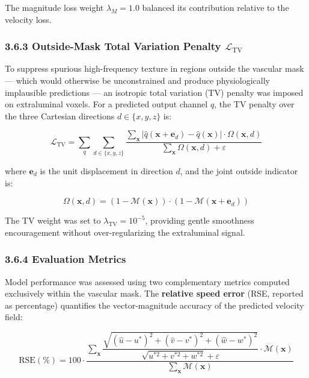 \documentclass[11pt]{article}
\begin{document}
The magnitude loss weight $\lambda_M = 1.0$ balanced its contribution relative to the velocity loss.

\subsubsection*{3.6.3 Outside-Mask Total Variation Penalty $\mathcal{L}_{\text{TV}}$}

To suppress spurious high-frequency texture in regions outside the vascular mask --- which would otherwise be unconstrained and produce physiologically implausible predictions --- an isotropic total variation (TV) penalty \cite{rudin1992tv,liu2019tvdip} was imposed on extraluminal voxels. For a predicted output channel $\hat{q}$, the TV penalty over the three Cartesian directions $d \in \{x, y, z\}$ is:

\begin{equation}
    \mathcal{L}_{\text{TV}} = \sum_{q} \sum_{d \in \{x,y,z\}} \frac{\sum_{\mathbf{x}} \left|\hat{q}(\mathbf{x} + \mathbf{e}_d) - \hat{q}(\mathbf{x})\right| \cdot \Omega(\mathbf{x}, d)}{\sum_{\mathbf{x}} \Omega(\mathbf{x}, d) + \varepsilon}
\end{equation}

where $\mathbf{e}_d$ is the unit displacement in direction $d$, and the joint outside indicator is:

\begin{equation}
    \Omega(\mathbf{x}, d) = \left(1 - \mathcal{M}(\mathbf{x})\right) \cdot \left(1 - \mathcal{M}(\mathbf{x} + \mathbf{e}_d)\right)
\end{equation}

The TV weight was set to $\lambda_{\text{TV}} = 10^{-5}$, providing gentle smoothness encouragement without over-regularizing the extraluminal signal.

\subsubsection*{3.6.4 Evaluation Metrics}

Model performance was assessed using two complementary metrics computed exclusively within the vascular mask. The \textbf{relative speed error} (RSE, reported as percentage) quantifies the vector-magnitude accuracy of the predicted velocity field:

\begin{equation}
    \text{RSE}(\%) = 100 \cdot \frac{
        \sum_{\mathbf{x}} \dfrac{\sqrt{(\hat{u}-u^*)^2+(\hat{v}-v^*)^2+(\hat{w}-w^*)^2}}{\sqrt{u^{*2}+v^{*2}+w^{*2}}+\varepsilon} \cdot \mathcal{M}(\mathbf{x})
    }{
        \sum_{\mathbf{x}} \mathcal{M}(\mathbf{x})
    }
\end{equation}
\end{document}
